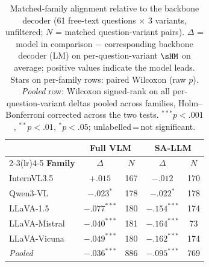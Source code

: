 \begin{table}[ht]
\centering\small\setlength{\tabcolsep}{5pt}
\begin{tabular}{l cc cc}
\toprule
& \multicolumn{2}{c}{\textbf{Full VLM}} & \multicolumn{2}{c}{\textbf{SA-LLM}} \\
\cmidrule(lr){2-3}\cmidrule(lr){4-5}
\textbf{Family} & $\Delta$ & $N$ & $\Delta$ & $N$ \\
\midrule
InternVL3.5 & $+.015$ & 167 & $-.012$ & 170 \\
Qwen3-VL & $-.023^{*}$ & 178 & $-.022^{*}$ & 178 \\
LLaVA-1.5 & $-.077^{***}$ & 180 & $-.154^{***}$ & 174 \\
LLaVA-Mistral & $-.040^{***}$ & 181 & $-.164^{***}$ & 73 \\
LLaVA-Vicuna & $-.049^{***}$ & 180 & $-.162^{***}$ & 174 \\
\midrule
\textit{Pooled} & $-.036^{***}$ & 886 & $-.095^{***}$ & 769 \\
\bottomrule
\end{tabular}
\caption{Matched-family alignment relative to the backbone decoder (61 free-text questions $\times$ 3 variants, unfiltered; $N$ = matched question-variant pairs).
$\Delta$ = model in comparison $-$ corresponding backbone decoder (LM) on per-question-variant $\sHM$ on average; positive values indicate the model leads.
Stars on per-family rows: paired Wilcoxon (raw $p$). \textit{Pooled} row: Wilcoxon signed-rank on all per-question-variant deltas pooled across families, Holm--Bonferroni corrected across the two tests. ${}^{***}p{<}.001$, ${}^{**}p{<}.01$, ${}^{*}p{<}.05$; unlabelled\,=\,not significant.}
\label{tab:matched_family_alignment_tests_ft_raw}
\end{table}